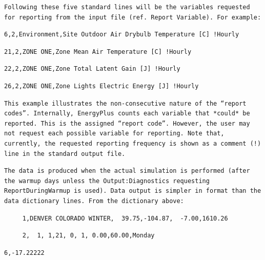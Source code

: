 \begin{lstlisting}
Following these five standard lines will be the variables requested for reporting from the input file (ref. Report Variable). For example:
\end{lstlisting}

\begin{lstlisting}
6,2,Environment,Site Outdoor Air Drybulb Temperature [C] !Hourly
\end{lstlisting}

\begin{lstlisting}
21,2,ZONE ONE,Zone Mean Air Temperature [C] !Hourly
\end{lstlisting}

\begin{lstlisting}
22,2,ZONE ONE,Zone Total Latent Gain [J] !Hourly
\end{lstlisting}

\begin{lstlisting}
26,2,ZONE ONE,Zone Lights Electric Energy [J] !Hourly
\end{lstlisting}

\begin{lstlisting}
This example illustrates the non-consecutive nature of the “report codes”. Internally, EnergyPlus counts each variable that *could* be reported. This is the assigned “report code”. However, the user may not request each possible variable for reporting. Note that, currently, the requested reporting frequency is shown as a comment (!) line in the standard output file.
\end{lstlisting}

\begin{lstlisting}
The data is produced when the actual simulation is performed (after the warmup days unless the Output:Diagnostics requesting ReportDuringWarmup is used). Data output is simpler in format than the data dictionary lines. From the dictionary above:
\end{lstlisting}

\begin{lstlisting}
     1,DENVER COLORADO WINTER,  39.75,-104.87,  -7.00,1610.26
\end{lstlisting}

\begin{lstlisting}
     2,  1, 1,21, 0, 1, 0.00,60.00,Monday
\end{lstlisting}

\begin{lstlisting}
6,-17.22222
\end{lstlisting}

